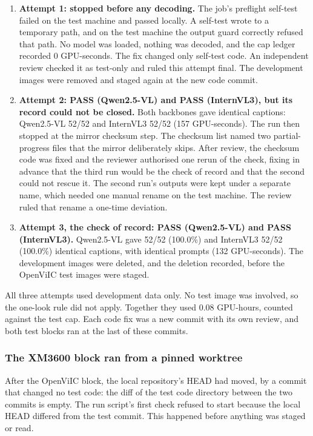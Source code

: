 \begin{enumerate}
\def\labelenumi{\arabic{enumi}.}
\tightlist
\item
  \textbf{Attempt 1: stopped before any decoding.} The job's preflight self-test failed on the test
  machine and passed locally. A self-test wrote to a temporary path, and on the test machine the
  output guard correctly refused that path. No model was loaded, nothing was decoded, and the cap
  ledger recorded 0 GPU-seconds. The fix changed only self-test code. An independent review checked
  it as test-only and ruled this attempt final. The development images were removed and staged again
  at the new code commit.
\item
  \textbf{Attempt 2: PASS (Qwen2.5-VL) and PASS (InternVL3), but its record could not be closed.}
  Both backbones gave identical captions: Qwen2.5-VL 52/52 and InternVL3 52/52 (157 GPU-seconds).
  The run then stopped at the mirror checksum step. The checksum list named two partial-progress
  files that the mirror deliberately skips. After review, the checksum code was fixed and the
  reviewer authorised one rerun of the check, fixing in advance that the third run would be the
  check of record and that the second could not rescue it. The second run's outputs were kept under
  a separate name, which needed one manual rename on the test machine. The review ruled that rename
  a one-time deviation.
\item
  \textbf{Attempt 3, the check of record: PASS (Qwen2.5-VL) and PASS (InternVL3).} Qwen2.5-VL gave
  52/52 (100.0\%) and InternVL3 52/52 (100.0\%) identical captions, with identical prompts (132
  GPU-seconds). The development images were deleted, and the deletion recorded, before the OpenViIC
  test images were staged.
\end{enumerate}

All three attempts used development data only. No test image was involved, so the one-look rule did
not apply. Together they used 0.08 GPU-hours, counted against the test cap. Each code fix was a new
commit with its own review, and both test blocks ran at the last of these commits.

\subsubsection{The XM3600 block ran from a pinned
worktree}\label{the-xm3600-block-ran-from-a-pinned-worktree}

After the OpenViIC block, the local repository's HEAD had moved, by a commit that changed no test
code: the diff of the test code directory between the two commits is empty. The run script's first
check refused to start because the local HEAD differed from the test commit. This happened before
anything was staged or read.

